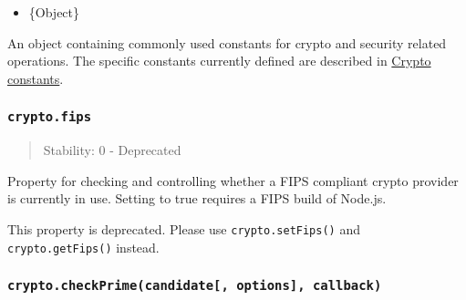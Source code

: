 \begin{itemize}
\tightlist
\item
  \{Object\}
\end{itemize}

An object containing commonly used constants for crypto and security
related operations. The specific constants currently defined are
described in \hyperref[crypto-constants]{Crypto constants}.

\subsubsection{\texorpdfstring{\texttt{crypto.fips}}{crypto.fips}}\label{crypto.fips}

\begin{quote}
Stability: 0 - Deprecated
\end{quote}

Property for checking and controlling whether a FIPS compliant crypto
provider is currently in use. Setting to true requires a FIPS build of
Node.js.

This property is deprecated. Please use \texttt{crypto.setFips()} and
\texttt{crypto.getFips()} instead.

\subsubsection{\texorpdfstring{\texttt{crypto.checkPrime(candidate{[},\ options{]},\ callback)}}{crypto.checkPrime(candidate{[}, options{]}, callback)}}\label{crypto.checkprimecandidate-options-callback}

